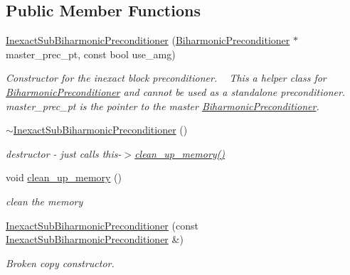 \subsection*{Public Member Functions}
\begin{DoxyCompactItemize}
\item 
\hyperlink{classoomph_1_1InexactSubBiharmonicPreconditioner_a495fa2a59d5511ec58813e7eca2e371e}{Inexact\+Sub\+Biharmonic\+Preconditioner} (\hyperlink{classoomph_1_1BiharmonicPreconditioner}{Biharmonic\+Preconditioner} $\ast$master\+\_\+prec\+\_\+pt, const bool use\+\_\+amg)
\begin{DoxyCompactList}\small\item\em Constructor for the inexact block preconditioner. ~\newline
This a helper class for \hyperlink{classoomph_1_1BiharmonicPreconditioner}{Biharmonic\+Preconditioner} and cannot be used as a standalone preconditioner. ~\newline
master\+\_\+prec\+\_\+pt is the pointer to the master \hyperlink{classoomph_1_1BiharmonicPreconditioner}{Biharmonic\+Preconditioner}. \end{DoxyCompactList}\item 
\hyperlink{classoomph_1_1InexactSubBiharmonicPreconditioner_a9c2031d51b753695f23b4ffb3bb41ecf}{$\sim$\+Inexact\+Sub\+Biharmonic\+Preconditioner} ()
\begin{DoxyCompactList}\small\item\em destructor -\/ just calls this-\/$>$\hyperlink{classoomph_1_1InexactSubBiharmonicPreconditioner_a5a8e4b8f01a5192066f1ac095845f308}{clean\+\_\+up\+\_\+memory()} \end{DoxyCompactList}\item 
void \hyperlink{classoomph_1_1InexactSubBiharmonicPreconditioner_a5a8e4b8f01a5192066f1ac095845f308}{clean\+\_\+up\+\_\+memory} ()
\begin{DoxyCompactList}\small\item\em clean the memory \end{DoxyCompactList}\item 
\hyperlink{classoomph_1_1InexactSubBiharmonicPreconditioner_a4753eaf54d7abf2fbd64c28d60b851de}{Inexact\+Sub\+Biharmonic\+Preconditioner} (const \hyperlink{classoomph_1_1InexactSubBiharmonicPreconditioner}{Inexact\+Sub\+Biharmonic\+Preconditioner} \&)
\begin{DoxyCompactList}\small\item\em Broken copy constructor. \end{DoxyCompactList}\item 

\end{DoxyCompactItemize}
